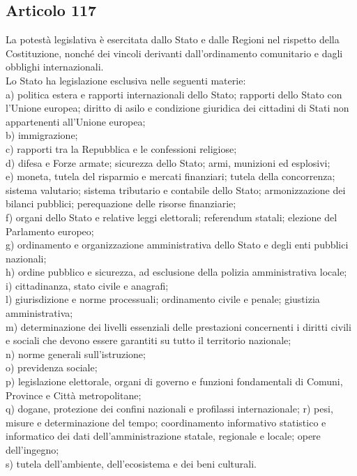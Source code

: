 \documentclass{article}
\newcommand{\articolo}[1]{
	\subsection*{Articolo #1}
}
\begin{document}
\articolo{117}
La potestà legislativa è esercitata dallo Stato e dalle Regioni nel rispetto della Costituzione, nonché dei vincoli derivanti dall’ordinamento comunitario e dagli obblighi internazionali.\\
Lo Stato ha legislazione esclusiva nelle seguenti materie:\\
a) politica estera e rapporti internazionali dello Stato; rapporti dello Stato con l’Unione europea; diritto di asilo e condizione giuridica dei cittadini di Stati non appartenenti all’Unione europea;\\
b) immigrazione;\\
c) rapporti tra la Repubblica e le confessioni religiose;\\
d) difesa e Forze armate; sicurezza dello Stato; armi, munizioni ed esplosivi;\\
e) moneta, tutela del risparmio e mercati finanziari; tutela della concorrenza; sistema valutario; sistema tributario e contabile dello Stato; armonizzazione dei bilanci pubblici; perequazione delle risorse finanziarie;\\
f) organi dello Stato e relative leggi elettorali; referendum statali; elezione del Parlamento europeo;\\
g) ordinamento e organizzazione amministrativa dello Stato e degli enti pubblici nazionali;\\
h) ordine pubblico e sicurezza, ad esclusione della polizia amministrativa locale;\\
i) cittadinanza, stato civile e anagrafi;\\
l) giurisdizione e norme processuali; ordinamento civile e penale; giustizia amministrativa;\\
m) determinazione dei livelli essenziali delle prestazioni concernenti i diritti civili e sociali che devono essere garantiti su tutto il territorio nazionale;\\
n) norme generali sull’istruzione;\\
o) previdenza sociale;\\
p) legislazione elettorale, organi di governo e funzioni fondamentali di Comuni, Province e Città metropolitane;\\
q) dogane, protezione dei confini nazionali e profilassi internazionale;
r) pesi, misure e determinazione del tempo; coordinamento informativo statistico e informatico dei dati dell’amministrazione statale, regionale e locale; opere dell’ingegno;\\
s) tutela dell’ambiente, dell’ecosistema e dei beni culturali.\\
\end{document}
